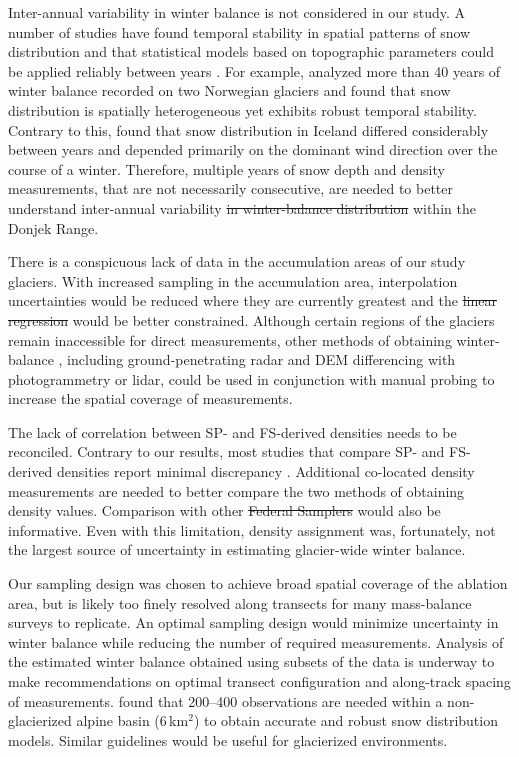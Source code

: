 \documentclass[review,oneside, letterpaper]{igs} %
\providecommand{\DIFadd}[1]{{\protect\color{blue}\uwave{#1}}} %
\providecommand{\DIFdel}[1]{{\protect\color{red}\sout{#1}}}                      %
\providecommand{\DIFaddbegin}{} %
\providecommand{\DIFaddend}{} %
\providecommand{\DIFdelbegin}{} %
\providecommand{\DIFdelend}{} %
\newcommand{\DIFscaledelfig}{0.5}
\newlength{\DIFdelgraphicswidth} %
\newlength{\DIFdelgraphicsheight} %
\newcommand{\DIFaddincludegraphics}[2][]{{\color{blue}\fbox{\DIFOincludegraphics[#1]{#2}}}} %
\newcommand{\DIFdelincludegraphics}[2][]{%
\sbox{\DIFdelgraphicsbox}{\DIFOincludegraphics[#1]{#2}}%
\settoboxwidth{\DIFdelgraphicswidth}{\DIFdelgraphicsbox} %
\settoboxtotalheight{\DIFdelgraphicsheight}{\DIFdelgraphicsbox} %
\scalebox{\DIFscaledelfig}{%
\parbox[b]{\DIFdelgraphicswidth}{\usebox{\DIFdelgraphicsbox}\\[-\baselineskip] \rule{\DIFdelgraphicswidth}{0em}}\llap{\resizebox{\DIFdelgraphicswidth}{\DIFdelgraphicsheight}{%
\setlength{\unitlength}{\DIFdelgraphicswidth}%
\begin{picture}(1,1)%
\thicklines\linethickness{2pt} %
{\color[rgb]{1,0,0}\put(0,0){\framebox(1,1){}}}%
{\color[rgb]{1,0,0}\put(0,0){\line( 1,1){1}}}%
{\color[rgb]{1,0,0}\put(0,1){\line(1,-1){1}}}%
\end{picture}%
}\hspace*{3pt}}} %
} %
\DeclareRobustCommand{\DIFaddbegin}{\DIFOaddbegin \let\includegraphics\DIFaddincludegraphics} %
\DeclareRobustCommand{\DIFaddend}{\DIFOaddend \let\includegraphics\DIFOincludegraphics} %
\DeclareRobustCommand{\DIFdelbegin}{\DIFOdelbegin \let\includegraphics\DIFdelincludegraphics} %
\DeclareRobustCommand{\DIFdelend}{\DIFOaddend \let\includegraphics\DIFOincludegraphics} %
\begin{document}
Inter-annual variability in winter balance is not considered in our study. A number of studies have found temporal stability in spatial patterns of snow distribution and that statistical models based on topographic parameters could be applied reliably between years \citep[e.g.][]{Grunewald2013}. For example, \cite{Walmsley2015} analyzed more than 40 years of winter balance recorded on two Norwegian glaciers and found that snow distribution is spatially heterogeneous yet exhibits robust temporal stability. Contrary to this, \cite{Crochet2007} found that snow distribution in Iceland differed considerably between years and depended primarily on the dominant wind direction over the course of a winter. Therefore, multiple years of snow depth and density measurements, that are not necessarily consecutive, are needed to better understand inter-annual variability \DIFdelbegin \DIFdel{in winter-balance distribution }\DIFdelend \DIFaddbegin \DIFadd{of winter balance }\DIFaddend within the Donjek Range.

There is a conspicuous lack of data in the accumulation areas of our study glaciers. With increased sampling in the accumulation area, interpolation uncertainties would be reduced where they are currently greatest and the \DIFdelbegin \DIFdel{linear regression }\DIFdelend \DIFaddbegin \DIFadd{LR }\DIFaddend would be better constrained. Although certain regions of the glaciers remain inaccessible for direct measurements, other methods of obtaining winter-balance \DIFaddbegin \DIFadd{measurements}\DIFaddend , including ground-penetrating radar and DEM differencing with photogrammetry or lidar, could be used in conjunction with manual probing to increase the spatial coverage of measurements.

The lack of correlation between SP- and FS-derived densities needs to be reconciled. Contrary to our results, most studies that compare SP- and FS-derived densities report minimal discrepancy \citep[e.g.][and sources within]{Dixon2012}. Additional co-located density measurements are needed to better compare the two methods of obtaining density values. Comparison with other \DIFdelbegin \DIFdel{Federal Samplers }\DIFdelend \DIFaddbegin \DIFadd{FS }\DIFaddend would also be informative. Even with this limitation, density assignment was, fortunately, not the largest source of uncertainty in estimating glacier-wide winter balance. 

Our sampling design was chosen to achieve broad spatial coverage of the ablation area, but is likely too finely resolved along transects for many mass-balance surveys to replicate. An optimal sampling design would minimize uncertainty in winter balance while reducing the number of required measurements. Analysis of the estimated winter balance obtained using subsets of the data is underway to make recommendations on optimal transect configuration and along-track spacing of measurements. \cite{Lopez2010} found that 200--400 observations are needed within a non-glacierized alpine basin (6\,km$^2$) to obtain accurate and robust snow distribution models. Similar guidelines would be useful for glacierized environments.
\end{document}
